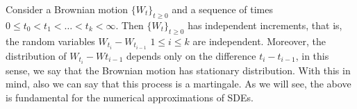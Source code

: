 	Consider a Brownian motion $\{W_t\}_{t\geq 0}$  and a sequence of times $0 \leq t_0 < t_1 < \ldots < t_k < \infty$.
Then $\{W_t\}_{t\geq 0}$ has independent increments, that is, the random variables $W_{t_i}-W_{t_{i-1}}$ 
$1\leq i \leq k $ are independent. Moreover, the distribution of $W_{t_i} - W{t_{i-1}}$ depends only on the 
difference $t_i - t_{i-1}$, in this sense, we say that the Brownian motion has stationary distribution. With this in
mind, also we can say that this process is a martingale. As we will see, the above is fundamental for the numerical 
approximations of SDEs.
%
